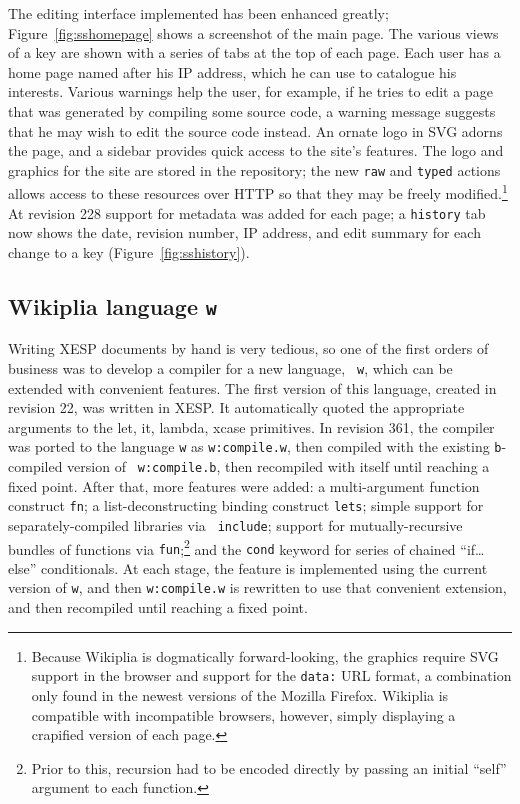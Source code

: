 \documentclass[twocolumn]{article}
\begin{document}
The editing interface implemented has been enhanced greatly;
Figure~\ref{fig:sshomepage} shows a screenshot of the main page. The
various views of a key are shown with a series of tabs at the top of
each page. Each user has a home page named after his IP
address,\z{} which he can use to catalogue his
interests. Various warnings help the user, for example, if he tries to
edit a page that was generated by compiling some source code, a
warning message suggests that he may wish to edit the source code
instead. An ornate logo in SVG adorns
the page, and a sidebar provides quick access to the site's features.
The logo and graphics for the site are stored in the repository; the
new {\tt raw} and {\tt typed} actions allows access to these resources
over HTTP so that they may be freely modified.\z\footnote{Because
Wikiplia is dogmatically forward-looking, the graphics require SVG
support in the browser and support for the {\tt data:} URL format, a
combination only found in the newest versions of the Mozilla Firefox.
Wikiplia is compatible with incompatible browsers, however, simply
displaying a crapified version of each page.} At revision 228 support
for metadata was added for each page; a {\tt history} tab now shows
the date, revision number, IP address, and edit summary for each
change to a key (Figure~\ref{fig:sshistory}).


\subsection{Wikiplia language {\tt w}}

Writing XESP documents by hand is very tedious, so one of the first
orders of business was to develop a compiler for a new language, {\tt
w}, which can be extended with convenient features. The first version
of this language, created in revision 22, was written in XESP. It
automatically quoted the appropriate arguments to the {\sf let}, {\sf
it}, {\sf lambda}, {\sf xcase} primitives. In revision 361, the
compiler was ported to the language {\tt w} as {\tt w:compile.w}, then
compiled with the existing {\tt b}-compiled version of {\tt
w:compile.b}, then recompiled with itself until reaching a fixed
point.\z{} After that, more features
were added: a multi-argument function construct {\tt fn}; a
list-deconstructing binding construct {\tt lets}; simple support for
separately-compiled libraries via {\tt
include}; support for mutually-recursive bundles of functions via {\tt fun};\footnote{Prior to
this, recursion had to be encoded directly by passing an initial
``self'' argument to each function.} and the {\tt cond} keyword for
series of chained ``if\ldots else'' conditionals. At each stage, the
feature is implemented using the current version of {\tt w}, and then
{\tt w:compile.w} is rewritten to use that convenient extension, and
then recompiled until reaching a fixed point.
\end{document}
